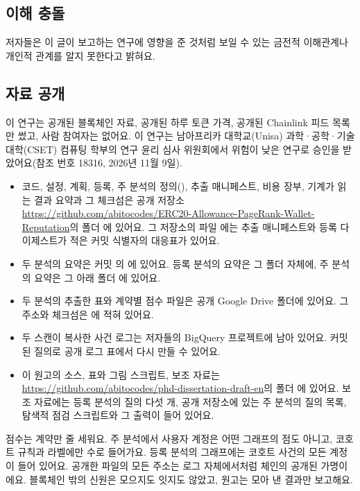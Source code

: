 \subsection*{이해 충돌}
저자들은 이 글이 보고하는 연구에 영향을 준 것처럼 보일 수 있는 금전적 이해관계나 개인적 관계를 알지 못한다고 밝혀요.

\subsection*{자료 공개}
이 연구는 공개된 블록체인 자료, 공개된 하루 토큰 가격, 공개된 Chainlink 피드 목록만 썼고, 사람 참여자는 없어요. 이 연구는 남아프리카 대학교(Unisa) 과학·공학·기술 대학(CSET) 컴퓨팅 학부의 연구 윤리 심사 위원회에서 위험이 낮은 연구로 승인을 받았어요(참조 번호 18316, 2026년 11월 9일).
\begin{itemize}
\item 코드, 설정, 계획, 등록, 주 분석의 정의(), 추출 매니페스트, 비용 장부, 기계가 읽는 결과 요약과 그 체크섬은 공개 저장소 \url{https://github.com/abitocodes/ERC20-Allowance-PageRank-Wallet-Reputation}의 폴더 에 있어요. 그 저장소의 파일 에는 추출 매니페스트와 등록 다이제스트가 적은 커밋 식별자의 대응표가 있어요.
\item 두 분석의 요약은 커밋 의 에 있어요. 등록 분석의 요약은 그 폴더 자체에, 주 분석의 요약은 그 아래 폴더 에 있어요.
\item 두 분석의 추출한 표와 계약별 점수 파일은 공개 Google Drive 폴더에 있어요. 그 주소와 체크섬은 에 적혀 있어요.
\item 두 스캔이 복사한 사건 로그는 저자들의 BigQuery 프로젝트에 남아 있어요. 커밋된 질의로 공개 로그 표에서 다시 만들 수 있어요.
\item 이 원고의 소스, 표와 그림 스크립트, 보조 자료는 \url{https://github.com/abitocodes/phd-dissertation-draft-en}의 폴더 에 있어요. 보조 자료에는 등록 분석의 질의 다섯 개, 공개 저장소에 있는 주 분석의 질의 목록, 탐색적 점검 스크립트와 그 출력이 들어 있어요.
\end{itemize}
점수는 계약만 줄 세워요. 주 분석에서 사용자 계정은 어떤 그래프의 점도 아니고, 코호트 규칙과 라벨에만 수로 들어가요. 등록 분석의 그래프에는 코호트 사건의 모든 계정이 들어 있어요. 공개한 파일의 모든 주소는 로그 자체에서처럼 체인의 공개된 가명이에요. 블록체인 밖의 신원은 모으지도 잇지도 않았고, 원고는 모아 낸 결과만 보고해요.

